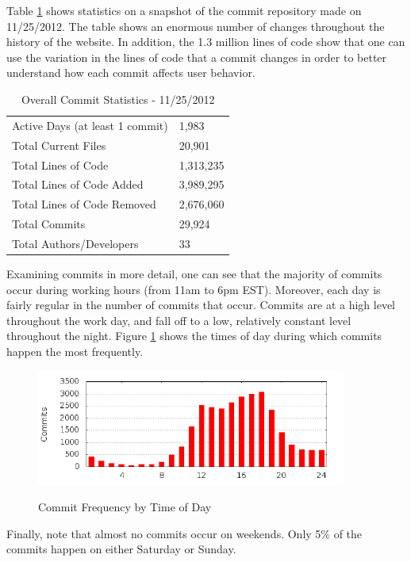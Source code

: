 \documentclass[10pt]{article}
\begin{document}
Table \ref{table:commit-stats} shows statistics on a snapshot of the commit repository made on 11/25/2012. The table shows an enormous number of changes throughout the history of the website. In addition, the 1.3 million lines of code show that one can use the variation in the lines of code that a commit changes in order to better understand how each commit affects user behavior.

\begin{table}[h!]
\centering
\caption{Overall Commit Statistics - 11/25/2012}
\begin{tabular}{l || l }
\hline
Active Days (at least 1 commit) & 1,983 \\
Total Current Files & 20,901 \\
Total Lines of Code & 1,313,235 \\
Total Lines of Code Added & 3,989,295 \\
Total Lines of Code Removed & 2,676,060 \\
Total Commits & 29,924 \\
Total Authors/Developers & 33 \\
\hline
\end{tabular}
\label{table:commit-stats}
\end{table}

Examining commits in more detail, one can see that the majority of commits occur during working hours (from 11am to 6pm EST). Moreover, each day is fairly regular in the number of commits that occur. Commits are at a high level throughout the work day, and fall off to a low, relatively constant level throughout the night. Figure \ref{fig:commit-hours} shows the times of day during which commits happen the most frequently. 

\begin{figure}[h!]
\centering
\caption{Commit Frequency by Time of Day}
\includegraphics[width=4in]{pictures/commit-hours.png}
\label{fig:commit-hours}
\end{figure}

Finally, note that almost no commits occur on weekends. Only 5\% of the commits happen on either Saturday or Sunday.
\end{document}
